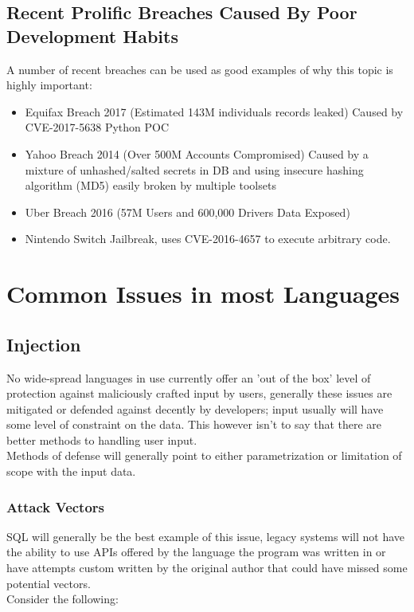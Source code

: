 \documentclass{IEEEtran}
\begin{document}
        \subsection{Recent Prolific Breaches Caused By Poor Development Habits}
            A number of recent breaches can be used as good examples of why this topic is highly 
            important:
            \begin{itemize}
                \item Equifax Breach 2017 (Estimated 143M individuals records leaked)\cite{Equifax-FTC}
                Caused by CVE-2017-5638\cite{CVE-2017-5638} Python POC\cite{POC-CVE-2017-5638}
                \item Yahoo Breach 2014 (Over 500M Accounts Compromised)\cite{Yahoo-Breach} Caused 
                by a mixture of unhashed/salted secrets in DB and using insecure hashing algorithm 
                (MD5) easily broken by multiple toolsets\cite{John-The-Ripper}
                \item Uber Breach 2016 (57M Users and 600,000 Drivers Data Exposed)\cite{Uber-Breach}
                \item Nintendo Switch Jailbreak, uses CVE-2016-4657\cite{CVE-2016-4657} to 
                execute arbitrary code\cite{POC-CVE-2016-4657}.
                
            \end{itemize}

    \section{Common Issues in most Languages}
        \subsection{Injection}
            No wide-spread languages in use currently offer an 'out of the box' level of 
            protection against maliciously crafted input by users, generally these issues are 
            mitigated or defended against decently by developers; input usually will have some level
            of constraint on the data.
            This however isn't to say that there are better methods to handling user input.
            \\
            Methods of defense will generally point to either parametrization or limitation of scope 
            with the input data.

            \subsubsection{Attack Vectors}
                SQL will generally be the best example of this issue, legacy systems will not have 
                the ability to use APIs offered by the language the program was written in or 
                have attempts custom written by the original author that could have missed some 
                potential vectors.
                \\
                Consider the following:
\end{document}
